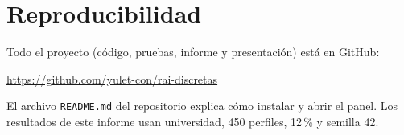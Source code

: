 \documentclass[12pt,letterpaper]{article}
\newcommand{\codigo}[1]{\texttt{#1}}
\begin{document}

\appendix
\section{Reproducibilidad}
Todo el proyecto (código, pruebas, informe y presentación) está en GitHub:

\begin{center}\url{https://github.com/yulet-con/rai-discretas}\end{center}

El archivo \codigo{README.md} del repositorio explica cómo instalar y abrir el panel. Los resultados de este informe usan universidad, 450 perfiles, 12\,\% y semilla 42.
\end{document}
